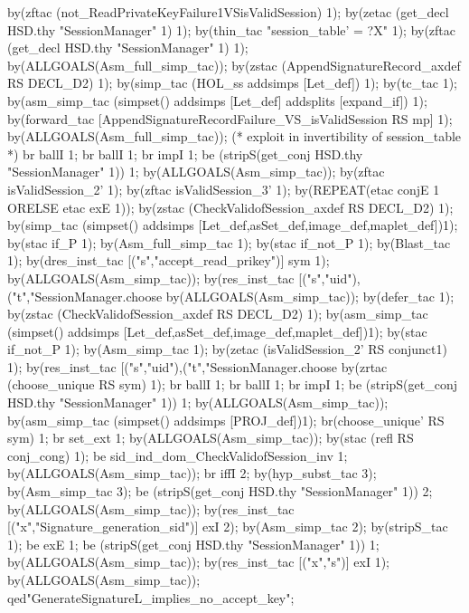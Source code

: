 \documentclass[a4paper,pdftex]{article}
\newenvironment{holz-proof}{\comment}{\endcomment}
\begin{document}
\begin{holz-proof}
by(zftac (not_ReadPrivateKeyFailure1VSisValidSession) 1);
by(zetac (get_decl HSD.thy "SessionManager" 1) 1);
by(thin_tac "session_table' = ?X" 1);
by(zftac (get_decl HSD.thy "SessionManager" 1) 1);
by(ALLGOALS(Asm_full_simp_tac));
by(zstac (AppendSignatureRecord_axdef RS DECL_D2) 1);
by(simp_tac (HOL_ss addsimps [Let_def]) 1);
by(tc_tac 1);
by(asm_simp_tac (simpset() addsimps [Let_def] addsplits [expand_if]) 1);
by(forward_tac [AppendSignatureRecordFailure_VS_isValidSession RS mp] 1);
by(ALLGOALS(Asm_full_simp_tac));
(* exploit in invertibility of session_table *)
br ballI 1; br ballI 1; br impI 1;
be (stripS(get_conj HSD.thy "SessionManager" 1)) 1;
by(ALLGOALS(Asm_simp_tac));
by(zftac isValidSession_2' 1);
by(zftac isValidSession_3' 1);
by(REPEAT(etac conjE 1 ORELSE etac exE 1));
by(zstac (CheckValidofSession_axdef RS DECL_D2) 1);
by(simp_tac (simpset() addsimps [Let_def,asSet_def,image_def,maplet_def])1);
by(stac if_P 1);
by(Asm_full_simp_tac 1);
by(stac if_not_P 1);
by(Blast_tac 1);
by(dres_inst_tac [("s","accept_read_prikey")] sym 1);
by(ALLGOALS(Asm_simp_tac));
by(res_inst_tac [("s","uid"),("t","SessionManager.choose %
by(ALLGOALS(Asm_simp_tac));
by(defer_tac 1);
by(zstac (CheckValidofSession_axdef RS DECL_D2) 1);
by(asm_simp_tac (simpset() addsimps [Let_def,asSet_def,image_def,maplet_def])1);
by(stac if_not_P 1);
by(Asm_simp_tac 1);
by(zetac (isValidSession_2' RS conjunct1) 1);
by(res_inst_tac [("s","uid"),("t","SessionManager.choose %
by(zrtac (choose_unique RS sym) 1);
br ballI 1; br ballI 1; br impI 1;
be (stripS(get_conj HSD.thy "SessionManager" 1)) 1;
by(ALLGOALS(Asm_simp_tac));
by(asm_simp_tac (simpset() addsimps [PROJ_def])1);
br(choose_unique' RS sym) 1;
br set_ext 1;
by(ALLGOALS(Asm_simp_tac));
by(stac (refl RS conj_cong) 1);
be sid_ind_dom_CheckValidofSession_inv 1;
by(ALLGOALS(Asm_simp_tac));
br iffI 2;
by(hyp_subst_tac 3);
by(Asm_simp_tac 3);
be (stripS(get_conj HSD.thy "SessionManager" 1)) 2;
by(ALLGOALS(Asm_simp_tac));
by(res_inst_tac [("x","Signature_generation_sid")] exI 2);
by(Asm_simp_tac 2);
by(stripS_tac 1);
be exE 1;
be (stripS(get_conj HSD.thy "SessionManager" 1)) 1;
by(ALLGOALS(Asm_simp_tac));
by(res_inst_tac [("x","s")] exI 1);
by(ALLGOALS(Asm_simp_tac));
qed"GenerateSignatureL_implies_no_accept_key";




\end{holz-proof}
\end{document}
